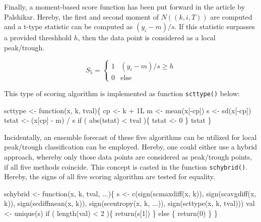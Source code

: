 \documentclass[a4paper]{article}
\begin{document}
Finally, a moment-based score function has been put forward in the
article by Palshikar. Hereby, the first and second moment of $N((k, i,
T))$ are computed and a t-type statistic can be computed as $(y_i - m)
/ s$. If this statistic surpasses a provided threshhold $h$, then the
data point is considered as a local peak/trough.

\begin{equation}
\label{S5}
S_5 =
\begin{cases}
1 & (y_i - m) / s \ge h \\
0 & \text{else}
\end{cases}
\end{equation}

This type of scoring algorithm is implemented as function
\verb?scttype()? below:

\nwenddocs{}\endmoddef
scttype <- function(x, k, tval)\{
    cp <- k + 1L
    m <- mean(x[-cp])
    s <- sd(x[-cp])
    tstat <- (x[cp] - m) / s
    if ( abs(tstat) < tval )\{
        tstat <- 0
    \}
    tstat
\}
\eatline
{}\nwendcode{}%

Incidentally, an ensemble forecast of these five algorithms can be
utilized for local peak/trough classification can be employed. Hereby,
one could either use a hybrid approach, whereby only those
data points are considered as peak/trough points, if all five methods
coincide. This concept is casted in the function
\verb?schybrid()?. Hereby, the signs of all five scoring algorithm are
tested for equality.

\nwenddocs{}\endmoddef
schybrid <- function(x, k, tval, ...)\{
    s <- c(sign(scmaxdiff(x, k)),
           sign(scavgdiff(x, k)),
           sign(scdiffmean(x, k)),
           sign(scentropy(x, k, ...)),
           sign(scttype(x, k, tval)))
    val <- unique(s)
    if ( length(val) < 2 )\{
        return(s[1])
    \} else \{
        return(0)
    \}
\}
\eatline
{}\nwendcode{}%
\end{document}
